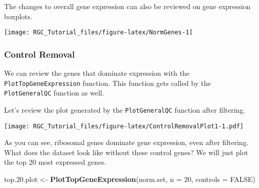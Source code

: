 \documentclass[]{article}
\newenvironment{Shaded}{\begin{snugshade}}{\end{snugshade}}
\newcommand{\DataTypeTok}[1]{\textcolor[rgb]{0.13,0.29,0.53}{#1}}
\newcommand{\DecValTok}[1]{\textcolor[rgb]{0.00,0.00,0.81}{#1}}
\newcommand{\FloatTok}[1]{\textcolor[rgb]{0.00,0.00,0.81}{#1}}
\newcommand{\KeywordTok}[1]{\textcolor[rgb]{0.13,0.29,0.53}{\textbf{#1}}}
\newcommand{\NormalTok}[1]{#1}
\newcommand{\OperatorTok}[1]{\textcolor[rgb]{0.81,0.36,0.00}{\textbf{#1}}}
\newcommand{\OtherTok}[1]{\textcolor[rgb]{0.56,0.35,0.01}{#1}}
\newcommand{\StringTok}[1]{\textcolor[rgb]{0.31,0.60,0.02}{#1}}
\begin{document}
The changes to overall gene expression can also be reviewed on gene
expression boxplots.

\begin{Shaded}
\end{Shaded}

\begin{center}\texttt{[image: RGC\_Tutorial\_files/figure-latex/NormGenes-1]} \end{center}

\hypertarget{control-removal}{%
\subsubsection{Control Removal}\label{control-removal}}

We can review the genes that dominate expression with the
\texttt{PlotTopGeneExpression} function. This function gets called by
the \texttt{PlotGeneralQC} function as well.

Let's review the plot generated by the \texttt{PlotGeneralQC} function
after filtering.

\begin{Shaded}
\end{Shaded}

\texttt{[image: RGC\_Tutorial\_files/figure-latex/ControlRemovalPlot1-1.pdf]}

As you can see, ribosomal genes dominate gene expression, even after
filtering. What does the dataset look like without these control genes?
We will just plot the top 20 most expressed genes.

\begin{Shaded}
\begin{Highlighting}[]
\NormalTok{top.}\FloatTok{20.}\NormalTok{plot <-}\StringTok{ }\KeywordTok{PlotTopGeneExpression}\NormalTok{(norm.set, }\DataTypeTok{n =} \DecValTok{20}\NormalTok{, }\DataTypeTok{controls =} \OtherTok{FALSE}\NormalTok{)}
\end{Highlighting}
\end{Shaded}
\end{document}
